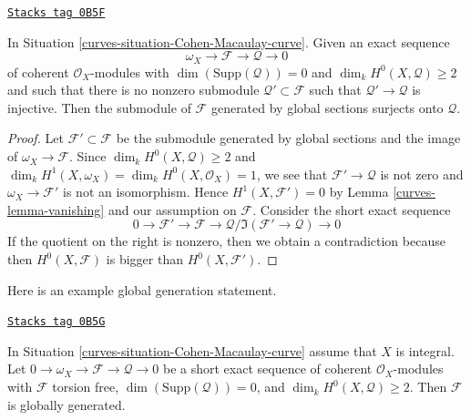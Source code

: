 \begin{lemma}
\label{curves-lemma-globally-generated}
\href{https://stacks.math.columbia.edu/tag/0B5F}{\texttt{Stacks tag 0B5F}}

In Situation \ref{curves-situation-Cohen-Macaulay-curve}. Given an exact sequence
$$
\omega_X \to \mathcal{F} \to \mathcal{Q} \to 0
$$
of coherent $\mathcal{O}_X$-modules with $\dim(\text{Supp}(\mathcal{Q})) = 0$
and $\dim_k H^0(X, \mathcal{Q}) \geq 2$ and such that there is no nonzero
submodule $\mathcal{Q}' \subset \mathcal{F}$ such that
$\mathcal{Q}' \to \mathcal{Q}$ is injective.
Then the submodule of $\mathcal{F}$ generated by global
sections surjects onto $\mathcal{Q}$.
\end{lemma}

\begin{proof}

Let $\mathcal{F}' \subset \mathcal{F}$ be the submodule generated by
global sections and the image of $\omega_X \to \mathcal{F}$. Since
$\dim_k H^0(X, \mathcal{Q}) \geq 2$ and
$\dim_k H^1(X, \omega_X) = \dim_k H^0(X, \mathcal{O}_X) = 1$,
we see that $\mathcal{F}' \to \mathcal{Q}$ is not zero and
$\omega_X \to \mathcal{F}'$ is not an isomorphism.
Hence $H^1(X, \mathcal{F}') = 0$ by Lemma \ref{curves-lemma-vanishing}
and our assumption on $\mathcal{F}$.
Consider the short exact sequence
$$
0 \to \mathcal{F}' \to \mathcal{F} \to
\mathcal{Q}/\Im(\mathcal{F}' \to \mathcal{Q}) \to 0
$$
If the quotient on the right is nonzero, then we obtain a contradiction
because then $H^0(X, \mathcal{F})$ is bigger than $H^0(X, \mathcal{F}')$.
\end{proof}

Here is an example global generation statement.

\begin{lemma}
\label{curves-lemma-globally-generated-curve}
\href{https://stacks.math.columbia.edu/tag/0B5G}{\texttt{Stacks tag 0B5G}}

In Situation \ref{curves-situation-Cohen-Macaulay-curve} assume that
$X$ is integral. Let $0 \to \omega_X \to \mathcal{F} \to \mathcal{Q} \to 0$
be a short exact sequence of coherent $\mathcal{O}_X$-modules with
$\mathcal{F}$ torsion free, $\dim(\text{Supp}(\mathcal{Q})) = 0$,
and $\dim_k H^0(X, \mathcal{Q}) \geq 2$. Then $\mathcal{F}$
is globally generated.
\end{lemma}

